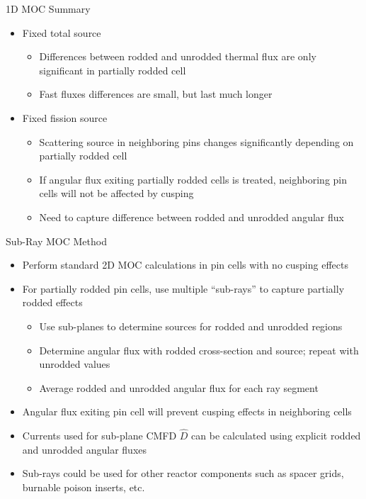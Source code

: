 
\begin{frame}[t]{1D MOC Summary}
    
    \begin{itemize}
        \item Fixed total source
        \begin{itemize}
            \item Differences between rodded and unrodded thermal flux are only significant in partially rodded cell
            \item Fast fluxes differences are small, but last much longer
        \end{itemize}
        \item Fixed fission source
        \begin{itemize}
            \item Scattering source in neighboring pins changes significantly depending on partially rodded cell
            \item If angular flux exiting partially rodded cells is treated, neighboring pin cells will not be affected by cusping
            \item Need to capture difference between rodded and unrodded angular flux
        \end{itemize}
    \end{itemize}
    
\end{frame}


\begin{frame}[t]{Sub-Ray MOC Method}
    
    \begin{itemize}
        \item Perform standard 2D MOC calculations in pin cells with no cusping effects
        \item For partially rodded pin cells, use multiple ``sub-rays'' to capture partially rodded effects
        \begin{itemize}
            \item Use sub-planes to determine sources for rodded and unrodded regions
            \item Determine angular flux with rodded cross-section and source; repeat with unrodded values
            \item Average rodded and unrodded angular flux for each ray segment
        \end{itemize}
        \item Angular flux exiting pin cell will prevent cusping effects in neighboring cells
        \item Currents used for sub-plane CMFD $\hat{D}$ can be calculated using explicit rodded and unrodded angular fluxes
        \item Sub-rays could be used for other reactor components such as spacer grids, burnable poison inserts, etc.
    \end{itemize}
    
\end{frame}

